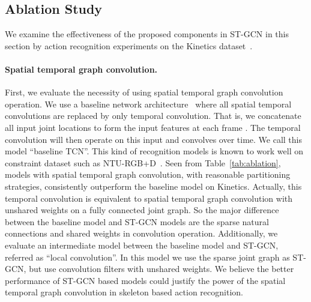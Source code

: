 \documentclass[letterpaper]{article} \usepackage{aaai18}  \usepackage{times}  \usepackage{helvet}  \usepackage{courier}  \usepackage{url}  \usepackage{graphicx}
\begin{document}
\subsection{Ablation Study}\label{sec:ablation}
We examine the effectiveness of the proposed components in ST-GCN in this section by action recognition experiments on the Kinetics dataset~\cite{Kay2017Kinetics}.

\paragraph{Spatial temporal graph convolution.}
First, we evaluate the necessity of using spatial temporal graph convolution operation.
We use a baseline network architecture~\cite{Kim2017CVPRW} where all spatial temporal convolutions are replaced by only temporal convolution. That is, we concatenate all input joint locations to form the input features at each frame .
The temporal convolution will then operate on this input and convolves over time.
We call this model ``baseline TCN''.
This kind of recognition models is known to work well on constraint dataset such as NTU-RGB+D~\cite{Kim2017CVPRW}.
Seen from Table~\ref{tab:ablation}, models with spatial temporal graph convolution, with reasonable partitioning strategies, consistently outperform the baseline model on Kinetics.
Actually, this temporal convolution is equivalent to spatial temporal graph convolution with unshared weights on a fully connected joint graph.
So the major difference between the baseline model and ST-GCN models are the sparse natural connections and shared weights in convolution operation.
Additionally, we evaluate an intermediate model between the baseline model and ST-GCN, referred as ``local convolution''. 
In this model we use the sparse joint graph as ST-GCN, but use convolution filters with unshared weights.
We believe the better performance of ST-GCN based models could justify the power of the spatial temporal graph convolution in skeleton based action recognition.
\end{document}
